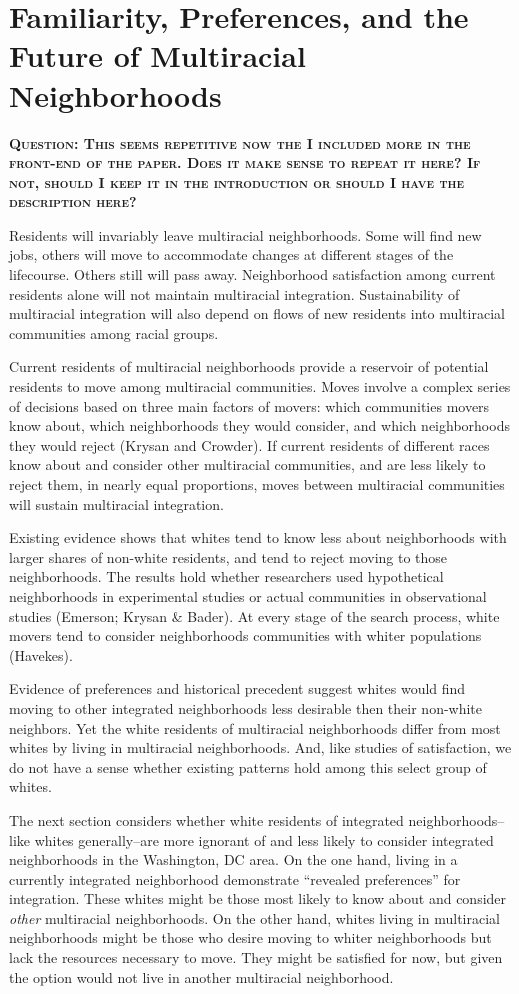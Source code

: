 \documentclass{baderart}
\begin{document}
\section{Familiarity, Preferences, and the Future of Multiracial Neighborhoods}

\textbf{\textsc{Question: This seems repetitive now the I included more in the front-end of the paper. Does it make sense to repeat it here? If not, should I keep it in the introduction or should I have the description here?}}

Residents will invariably leave multiracial neighborhoods. Some will find new jobs, others will move to accommodate changes at different stages of the lifecourse. Others still will pass away. Neighborhood satisfaction among current residents alone will not maintain multiracial integration. Sustainability of multiracial integration will also depend on flows of new residents into multiracial communities among racial groups.

Current residents of multiracial neighborhoods provide a reservoir of potential residents to move among multiracial communities. Moves involve a complex series of decisions based on three main factors of movers: which communities movers know about, which neighborhoods they would consider, and which neighborhoods they would reject (Krysan and Crowder). If current residents of different races know about and consider other multiracial communities, and are less likely to reject them, in nearly equal proportions, moves between multiracial communities will sustain multiracial integration.

Existing evidence shows that whites tend to know less about neighborhoods with larger shares of non-white residents, and tend to reject moving to those neighborhoods. The results hold whether researchers used hypothetical neighborhoods in experimental studies or actual communities in observational studies (Emerson; Krysan \& Bader). At every stage of the search process, white movers tend to consider neighborhoods communities with whiter populations (Havekes).

Evidence of preferences and historical precedent suggest whites would find moving to other integrated neighborhoods less desirable then their non-white neighbors. Yet the white residents of multiracial neighborhoods differ from most whites by living in multiracial neighborhoods. And, like studies of satisfaction, we do not have a sense whether existing patterns hold among this select group of whites.

The next section considers whether white residents of integrated neighborhoods--like whites generally--are more ignorant of and less likely to consider integrated neighborhoods in the Washington, DC area. On the one hand, living in a currently integrated neighborhood demonstrate ``revealed preferences'' for integration. These whites might be those most likely to know about and consider \emph{other} multiracial neighborhoods. On the other hand, whites living in multiracial neighborhoods might be those who desire moving to whiter neighborhoods but lack the resources necessary to move. They might be satisfied for now, but given the option would not live in another multiracial neighborhood.
\end{document}
